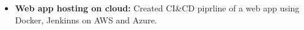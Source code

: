 \documentclass[11pt,a4paper]{moderncv}
\begin{document}
\begin{itemize}	
	
%	
	\item\textbf{Web app hosting on cloud:} Created CI\&CD piprline of a web app using Docker, Jenkinns on AWS and Azure.
	
	
		
   
	
\end{itemize}
	
\end{document}
